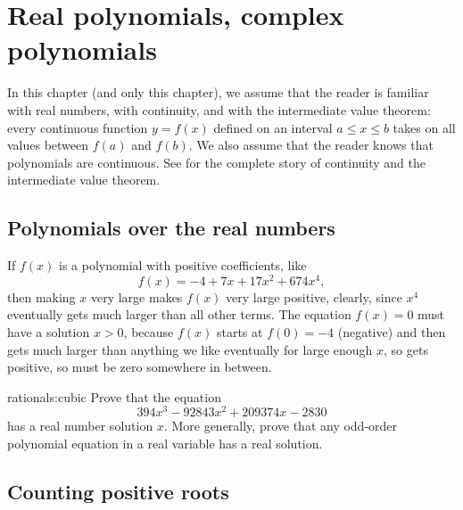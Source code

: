 \chapter{Real polynomials, complex polynomials}

In this chapter (and only this chapter), we assume that the reader is familiar with real numbers, with continuity, and with the intermediate value theorem: every continuous function \(y=f(x)\) defined on an interval \(a \le x \le b\) takes on all values between \(f(a)\) and \(f(b)\).
We also assume that the reader knows that polynomials are continuous.
See \cite{Spivak:2006} for the complete story of continuity and the intermediate value theorem.

\section{Polynomials over the real numbers}

\begin{example}
If \(f(x)\) is a polynomial with positive coefficients, like
\[
f(x)=-4 + 7x + 17x^2 + 674x^4,
\]
then making \(x\) very large makes \(f(x)\) very large positive, clearly, since \(x^4\) eventually gets much larger than all other terms.
The equation \(f(x)=0\) must have a solution \(x>0\), because \(f(x)\) starts at \(f(0)=-4\) (negative) and then gets much larger than anything we like eventually for large enough \(x\), so gets positive, so must be zero somewhere in between.
\end{example}

\begin{problem}{rationals:cubic}
Prove that the equation
\[
394x^3-92843x^2+209374x-2830
\]
has a real number solution \(x\).
More generally, prove that any odd-order polynomial equation in a real variable has a real solution.
\end{problem}


\section{Counting positive roots}

